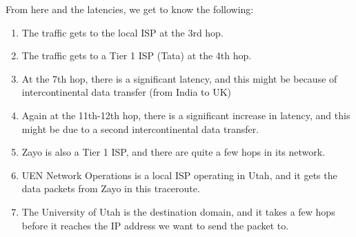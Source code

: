 \documentclass[a4paper]{article}
\begin{document}
From here and the latencies, we get to know the following:

\begin{enumerate}
    \item The traffic gets to the local ISP at the 3rd hop.
    \item The traffic gets to a Tier 1 ISP (Tata) at the 4th hop.
    \item At the 7th hop, there is a significant latency, and this might be because of intercontinental data transfer (from India to UK)
    \item Again at the 11th-12th hop, there is a significant increase in latency, and this might be due to a second intercontinental data transfer.
    \item Zayo is also a Tier 1 ISP, and there are quite a few hops in its network.
    \item UEN Network Operations is a local ISP operating in Utah, and it gets the data packets from Zayo in this traceroute.
    \item The University of Utah is the destination domain, and it takes a few hops before it reaches the IP address we want to send the packet to.
\end{enumerate}
\end{document}
